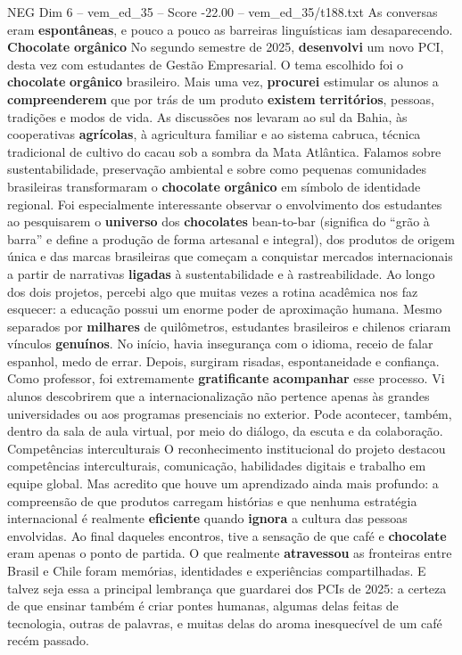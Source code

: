 \begin{textsample}{NEG Dim 6 – vem\_ed\_35 – Score -22.00 – vem\_ed\_35/t188.txt}
As conversas eram \textbf{espontâneas}, e pouco a pouco as barreiras linguísticas iam desaparecendo. \textbf{Chocolate} \textbf{orgânico} No segundo semestre de 2025, \textbf{desenvolvi} um novo PCI, desta vez com estudantes de Gestão Empresarial.
O tema escolhido foi o \textbf{chocolate} \textbf{orgânico} brasileiro.
Mais uma vez, \textbf{procurei} estimular os alunos a \textbf{compreenderem} que por trás de um produto \textbf{existem} \textbf{territórios}, pessoas, tradições e modos de vida.
As discussões nos levaram ao sul da Bahia, às cooperativas \textbf{agrícolas}, à agricultura familiar e ao sistema cabruca, técnica tradicional de cultivo do cacau sob a sombra da Mata Atlântica.
Falamos sobre sustentabilidade, preservação ambiental e sobre como pequenas comunidades brasileiras transformaram o \textbf{chocolate} \textbf{orgânico} em símbolo de identidade regional.
Foi especialmente interessante observar o envolvimento dos estudantes ao pesquisarem o \textbf{universo} dos \textbf{chocolates} bean-to-bar (significa do “grão à barra” e define a produção de forma artesanal e integral), dos produtos de origem única e das marcas brasileiras que começam a conquistar mercados internacionais a partir de narrativas \textbf{ligadas} à sustentabilidade e à rastreabilidade.
Ao longo dos dois projetos, percebi algo que muitas vezes a rotina acadêmica nos faz esquecer: a educação possui um enorme poder de aproximação humana.
Mesmo separados por \textbf{milhares} de quilômetros, estudantes brasileiros e chilenos criaram vínculos \textbf{genuínos}.
No início, havia insegurança com o idioma, receio de falar espanhol, medo de errar.
Depois, surgiram risadas, espontaneidade e confiança.
Como professor, foi extremamente \textbf{gratificante} \textbf{acompanhar} esse processo.
Vi alunos descobrirem que a internacionalização não pertence apenas às grandes universidades ou aos programas presenciais no exterior.
Pode acontecer, também, dentro da sala de aula virtual, por meio do diálogo, da escuta e da colaboração.
Competências interculturais O reconhecimento institucional do projeto destacou competências interculturais, comunicação, habilidades digitais e trabalho em equipe global.
Mas acredito que houve um aprendizado ainda mais profundo: a compreensão de que produtos carregam histórias e que nenhuma estratégia internacional é realmente \textbf{eficiente} quando \textbf{ignora} a cultura das pessoas envolvidas.
Ao final daqueles encontros, tive a sensação de que café e \textbf{chocolate} eram apenas o ponto de partida.
O que realmente \textbf{atravessou} as fronteiras entre Brasil e Chile foram memórias, identidades e experiências compartilhadas.
E talvez seja essa a principal lembrança que guardarei dos PCIs de 2025: a certeza de que ensinar também é criar pontes humanas, algumas delas feitas de tecnologia, outras de palavras, e muitas delas do aroma inesquecível de um café recém passado.


\end{textsample}
